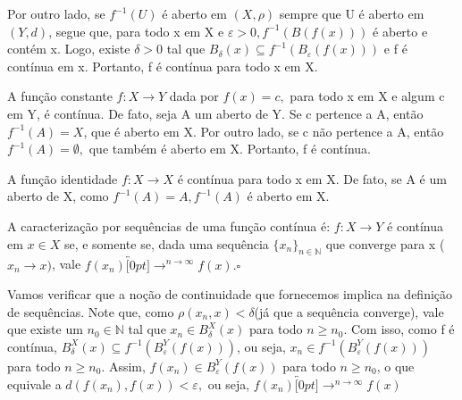 \documentclass[MetricSpaces/metric_notes.tex]{subfiles}
\begin{document}
Por outro lado, se \(f^{-1}(U)\) é aberto em \((X, \rho )\) sempre que U é aberto em
\((Y, d)\), segue que, para todo x em X e \(\varepsilon >0, f^{-1}(B(f(x)))\) é aberto e contém x.
Logo, existe \(\delta  > 0\) tal que \(B_{\delta }(x)\subseteq{f^{-1}(B_{\varepsilon }(f(x)))}\) e f é contínua em x.
Portanto, f é contínua para todo x em X.
\begin{example}
	A função constante \(f:X\rightarrow Y\) dada por \(f(x) = c,\) para todo x em X e algum c em Y, é contínua.
	De fato, seja A um aberto de Y. Se c pertence a A, então \(f^{-1}(A) = X\), que é aberto em X. Por
	outro lado, se c não pertence a A, então \(f^{-1}(A) = \emptyset,\) que também é aberto em X. Portanto, f é contínua.
\end{example}
\begin{example}
	A função identidade \(f:X\rightarrow X\) é contínua para todo x em X. De fato, se A é um aberto de X,
	como \(f^{-1}(A) = A, f^{-1}(A)\) é aberto em X.
\end{example}
\begin{def*}
	A caracterização por sequências de uma função contínua é: \(f:X\rightarrow Y\) é contínua em \(x\in X\) se, e somente se, dada uma sequência \(\{x_{n}\}_{n\in \mathbb{N}}\) que
	converge para x (\(x_{n}\longrightarrow x)\), vale \(f(x_{n})\overbracket[0pt]{\longrightarrow}^{n\to \infty}f(x).\square\)
\end{def*}
Vamos verificar que a noção de continuidade que fornecemos implica na definição de sequências. Note que, como \(\rho (x_{n}, x) < \delta \)(já que a sequência converge), vale que existe um \(n_{0}\in \mathbb{N}\) tal que
\(x_{n}\in B_{\delta }^{X}(x)\) para todo \(n\geq n_{0}\). Com isso, como f é contínua, \(B_{\delta }^{X}(x)\subseteq{f^{-1}(B_{\varepsilon }^{Y}(f(x)))}\), ou seja, \(x_{n}\in f^{-1}(B_{\varepsilon }^{Y}(f(x)))\) para todo \(n\geq n_{0}.\)
Assim, \(f(x_{n})\in B_{\varepsilon }^{Y}(f(x))\) para todo \(n\geq n_{0}\), o que equivale a \(d(f(x_{n}), f(x)) < \varepsilon,\) ou seja, \(f(x_{n})\overbracket[0pt]{\longrightarrow}^{n\to \infty}f(x)\)
\end{document}
